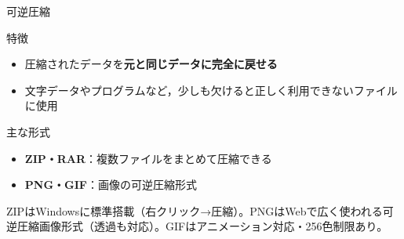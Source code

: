 \documentclass[aspectratio=43,professionalfonts,handout,10pt]{beamer}
\begin{document}
\begin{frame}{可逆圧縮}
  \begin{block}{特徴}
    \begin{itemize}
      \item 圧縮されたデータを\textbf{元と同じデータに完全に戻せる}
      \item 文字データやプログラムなど，少しも欠けると正しく利用できないファイルに使用
    \end{itemize}
  \end{block}

  \vfill

  \begin{exampleblock}{主な形式}
    \begin{itemize}
      \item \textbf{ZIP・RAR}：複数ファイルをまとめて圧縮できる
      \item \textbf{PNG・GIF}：画像の可逆圧縮形式
    \end{itemize}
  \end{exampleblock}

  \begin{slidenote}
    \scriptsize ZIPはWindowsに標準搭載（右クリック→圧縮）。PNGはWebで広く使われる可逆圧縮画像形式（透過も対応）。GIFはアニメーション対応・256色制限あり。
  \end{slidenote}
\end{frame}

\end{document}
